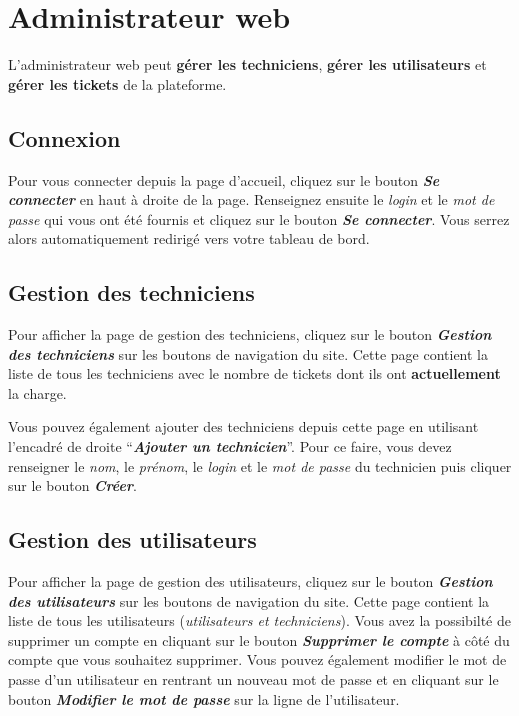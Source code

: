 \documentclass[12pt, a4paper]{article}
\begin{document}
\section{Administrateur web}

L'administrateur web peut \textbf{gérer les techniciens}, \textbf{gérer les utilisateurs} et \textbf{gérer les tickets} de la plateforme.

\subsection*{Connexion}

Pour vous connecter depuis la page d'accueil, cliquez sur le bouton \textit{\textbf{Se connecter}} en haut à droite de la page.
Renseignez ensuite le \textit{login} et le \textit{mot de passe} qui vous ont été fournis et cliquez sur le bouton \textit{\textbf{Se connecter}}.
Vous serrez alors automatiquement redirigé vers votre tableau de bord.

\subsection*{Gestion des techniciens}

Pour afficher la page de gestion des techniciens, cliquez sur le bouton \textit{\textbf{Gestion des techniciens}} sur les boutons de navigation du site.
Cette page contient la liste de tous les techniciens avec le nombre de tickets dont ils ont \textbf{actuellement} la charge.

\bigskip
\noindent Vous pouvez également ajouter des techniciens depuis cette page en utilisant l'encadré de droite ``\textit{\textbf{Ajouter un technicien}}''.
Pour ce faire, vous devez renseigner le \textit{nom}, le \textit{prénom}, le \textit{login} et le \textit{mot de passe} du technicien puis cliquer sur le bouton \textit{\textbf{Créer}}.

\subsection*{Gestion des utilisateurs}

Pour afficher la page de gestion des utilisateurs, cliquez sur le bouton \textit{\textbf{Gestion des utilisateurs}} sur les boutons de navigation du site.
Cette page contient la liste de tous les utilisateurs (\textit{utilisateurs et techniciens}).
Vous avez la possibilté de supprimer un compte en cliquant sur le bouton \textit{\textbf{Supprimer le compte}} à côté du compte que vous souhaitez supprimer.
Vous pouvez également modifier le mot de passe d'un utilisateur en rentrant un nouveau mot de passe et en cliquant sur le bouton \textit{\textbf{Modifier le mot de passe}} sur la ligne de l'utilisateur.
\end{document}
